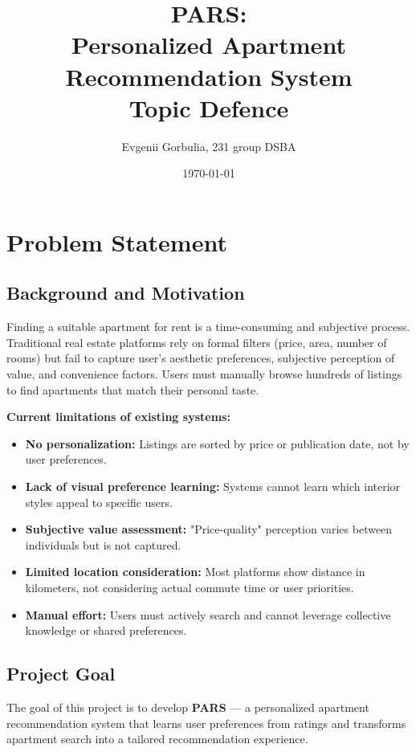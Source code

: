 \documentclass[12pt,a4paper]{article}
\title{PARS:\\Personalized Apartment Recommendation System\\Topic Defence}
\author{Evgenii Gorbulia, 231 group DSBA}
\date{\today}
\begin{document}
\maketitle
\tableofcontents
\newpage

\section{Problem Statement}

\subsection{Background and Motivation}

Finding a suitable apartment for rent is a time-consuming and subjective process. Traditional real estate platforms rely on formal filters (price, area, number of rooms) but fail to capture user's aesthetic preferences, subjective perception of value, and convenience factors. Users must manually browse hundreds of listings to find apartments that match their personal taste.

\textbf{Current limitations of existing systems:}
\begin{itemize}
    \item \textbf{No personalization:} Listings are sorted by price or publication date, not by user preferences.
    \item \textbf{Lack of visual preference learning:} Systems cannot learn which interior styles appeal to specific users.
    \item \textbf{Subjective value assessment:} "Price-quality" perception varies between individuals but is not captured.
    \item \textbf{Limited location consideration:} Most platforms show distance in kilometers, not considering actual commute time or user priorities.
    \item \textbf{Manual effort:} Users must actively search and cannot leverage collective knowledge or shared preferences.
\end{itemize}

\subsection{Project Goal}

The goal of this project is to develop \textbf{PARS} — a personalized apartment recommendation system that learns user preferences from ratings and transforms apartment search into a tailored recommendation experience.
\end{document}
